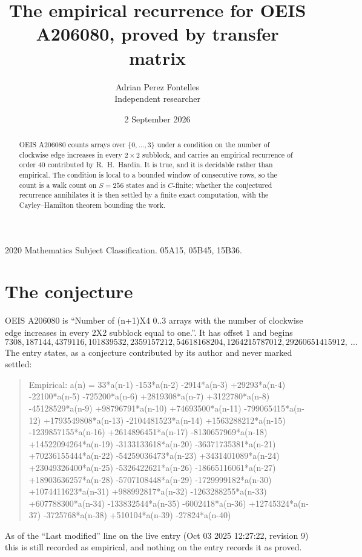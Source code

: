 \documentclass[11pt,a4paper]{article}
\title{The empirical recurrence for OEIS A206080, proved by transfer matrix}
\author{Adrian Perez Fontelles\\ \small Independent researcher}
\date{2 September 2026}
\theoremstyle{plain}
\theoremstyle{definition}
\begin{document}
\maketitle

\begin{abstract}
OEIS A206080 counts arrays over $\{0,\dots,3\}$ under a condition on the number of clockwise edge increases
in every $2\times2$ subblock, and carries an empirical recurrence of order $40$ contributed by
R.~H.~Hardin. It is true, and it is decidable rather than empirical. The condition is local to
a bounded window of consecutive rows, so the count is a walk count on $S=256$ states and is
$C$-finite; whether the conjectured recurrence annihilates it is then settled by a finite exact
computation, with the Cayley--Hamilton theorem bounding the work.
\end{abstract}

\noindent\small 2020 Mathematics Subject Classification. 05A15, 05B45, 15B36.\normalsize

\section{The conjecture}

OEIS A206080 is ``Number of (n+1)X4 0..3 arrays with the number of clockwise edge increases in every 2X2 subblock equal to one.''. It has offset $1$ and begins
\[
7308, 187144, 4379116, 101839532, 2359157212, 54618168204, 1264215787012, 29260651415912,\ \dots
\]
The entry states, as a conjecture contributed by its author and never marked settled:
\begin{quote}
Empirical: a(n) = 33*a(n-1) -153*a(n-2) -2914*a(n-3) +29293*a(n-4) -22100*a(n-5) -725200*a(n-6) +2819308*a(n-7) +3122780*a(n-8) -45128529*a(n-9) +98796791*a(n-10) +74693500*a(n-11) -799065415*a(n-12) +1793549808*a(n-13) -2104481523*a(n-14) +1563288212*a(n-15) -1239857155*a(n-16) +2614896451*a(n-17) -8130657969*a(n-18) +14522094264*a(n-19) -3133133618*a(n-20) -36371735381*a(n-21) +70236155444*a(n-22) -54259036473*a(n-23) +3431401089*a(n-24) +23049326400*a(n-25) -5326422621*a(n-26) -18665116061*a(n-27) +18903636257*a(n-28) -5707108448*a(n-29) -1729999182*a(n-30) +1074411623*a(n-31) +988992817*a(n-32) -1263288255*a(n-33) +607788300*a(n-34) -133832544*a(n-35) -6002418*a(n-36) +12745324*a(n-37) -3725768*a(n-38) +510104*a(n-39) -27824*a(n-40)
\end{quote}
As of the ``Last modified'' line on the live entry (Oct 03 2025 12:27:22, revision 9) this is still
recorded as empirical, and nothing on the entry records it as proved.
\end{document}

